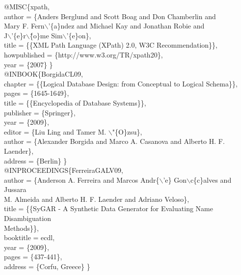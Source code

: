 \documentclass[jidm,a4paper]{jidm} %
\newenvironment{latexcode}
{\ttfamily\vspace{0.1in}\setlength{\parindent}{18pt}}
{\vspace{0.1in}}
\begin{document}
\begin{latexcode}
@MISC\{xpath, \\\indent\indent
  author = \{Anders Berglund and Scott Boag and Don Chamberlin and \\\indent\indent
  Mary F. Fern$\backslash$'\{a\}ndez and Michael Kay  and Jonathan Robie and \\\indent\indent
  J$\backslash$'\{e\}r$\backslash$\^\{o\}me Sim$\backslash$'\{e\}on\},\\\indent\indent
  title = \{\{XML Path Language (XPath) 2.0, W3C Recommendation\}\},\\\indent\indent
  howpublished = \{http://www.w3.org/TR/xpath20\},\\\indent\indent
  year = \{2007\} \}\\

@INBOOK\{BorgidaCL09,\\\indent\indent
  chapter = \{\{Logical Database Design: from Conceptual to Logical Schema\}\},\\\indent\indent
  pages = \{1645-1649\},\\\indent\indent
  title = \{\{Encyclopedia of Database Systems\}\},\\\indent\indent
  publisher = \{Springer\},\\\indent\indent
  year = \{2009\},\\\indent\indent
  editor = \{Liu Ling and Tamer M. $\backslash$"\{O\}zsu\},\\\indent\indent
  author = \{Alexander Borgida and Marco A. Casanova and Alberto H. F. Laender\},\\\indent\indent
  address = \{Berlin\} \}\\

@INPROCEEDINGS\{FerreiraGALV09,\\\indent\indent
  author = \{Anderson A. Ferreira and Marcos Andr\{$\backslash$'e\} Gon$\backslash$c\{c\}alves and Jussara\\\indent\indent
	M. Almeida and Alberto H. F. Laender and Adriano Veloso\},\\\indent\indent
  title = \{\{SyGAR - A Synthetic Data Generator for Evaluating Name Disambiguation\\\indent\indent
	Methods\}\},\\\indent\indent
  booktitle = ecdl,\\\indent\indent
  year = \{2009\},\\\indent\indent
  pages = \{437-441\},\\\indent\indent
  address = \{Corfu, Greece\} \}\\


\end{latexcode}
\end{document}
